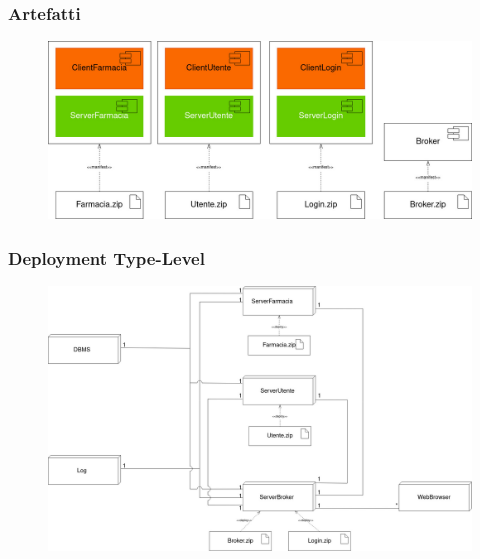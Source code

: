\subsubsection{Artefatti}

\begin{figure}[h!]
    \begin{center}
        \includegraphics[width=\textwidth]{immagini/Deployment-Artefatti.jpg}
    \end{center}
\end{figure}

\subsubsection{Deployment Type-Level}

\begin{figure}[h!]
    \begin{center}
        \includegraphics[width=\textwidth]{immagini/Deployment-TypeLevel.jpg}
    \end{center}
\end{figure}
